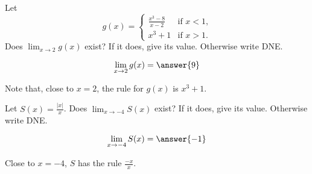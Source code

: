 \documentclass{ximera}
\begin{document}
\begin{exercise}

Let
\[
g(x) = \begin{cases}
  \frac{x^3 - 8}{x-2}  &\text{if $x<1$,} \\
  x^3+1 &\text{if  $x>1$.}
\end{cases}
\]
Does $\lim_{x \to 2} g(x)$ exist?  If it does, give its value.
Otherwise write DNE.
\begin{prompt}
\[
\lim_{x \to 2} g(x) = \answer{9}
\]
\end{prompt}
\begin{hint}
	Note that, close to $x=2$, the rule for $g(x)$ is $x^3+1$.
\end{hint}
\end{exercise}


\begin{exercise}

Let $S(x) = \frac{|x|}{x}$.  Does $\lim_{x \to -4} S(x)$ exist?  If it
does, give its value.  Otherwise write DNE.
\begin{prompt}
\[
\lim_{x \to -4} S(x) = \answer{-1}
\] 
\end{prompt}
\begin{hint}
  Close to $x=-4$, $S$ has the rule $\frac{-x}{x}$.
\end{hint}


\end{exercise}
\end{document}

